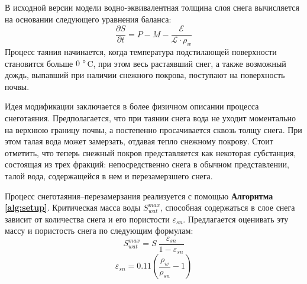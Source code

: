 \documentclass[a4paper, fontsize=12pt]{scrartcl}
\begin{document}
В исходной версии модели водно-эквивалентная толщина слоя снега вычисляется на основании следующего уравнения баланса:
\begin{equation}
    \dfrac{\partial S}{\partial t} = P - M - \dfrac{\mathcal{E}}{\mathcal{L} \cdot \rho_w}  \label{sys}
\end{equation}
Процесс таяния начинается, когда температура подстилающей поверхности становится больше $0 ~\degree$C, при этом весь растаявший снег, а также возможный дождь, выпавший при наличии снежного покрова, поступают на поверхность почвы.

Идея модификации заключается в более физичном описании процесса снеготаяния. Предполагается, что при таянии снега вода не уходит моментально на верхнюю границу почвы, а постепенно просачивается сквозь толщу снега. При этом талая вода может замерзать, отдавая тепло снежному покрову. Стоит отметить, что теперь снежный покров представляется как некоторая субстанция, состоящая из трех фракций: непосредственно снега в обычном представлении, талой вода, содержащейся в нем и перезамерзшего снега. 

Процесс снеготаяния--перезамерзания реализуется с помощью \textbf{Алгоритма \ref{alg:setup}}. 
Критическая масса воды $S_{wat}^{max}$, способная содержаться в слое снега зависит от количества снега и его пористости $\varepsilon_{sn}$. Предлагается оценивать эту массу \cite{Gusev2002} и пористость снега \cite{Stock} по следующим формулам:
\begin{equation}
     S_{wat}^{max} = S ~\dfrac{\varepsilon_{sn}}{1 - \varepsilon_{sn}}  \label{sys}  
\end{equation}
\begin{equation}
    \varepsilon_{sn} = 0.11 \left( \dfrac{\rho_w}{\rho_{sn}} - 1 \right)  \label{sys}  
\end{equation}
\end{document}
